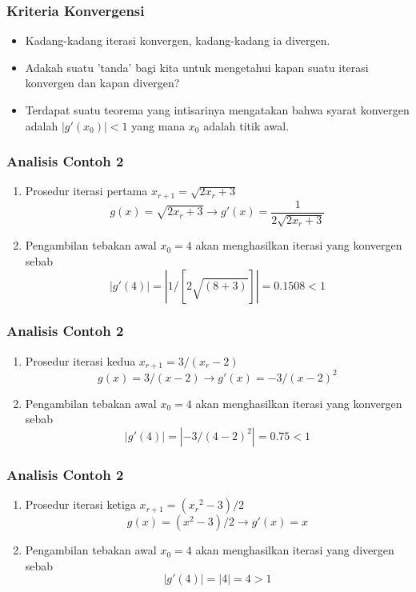 \documentclass[pdflatex,compress]{beamer}
\begin{document}
\begin{frame}
	\frametitle{Kriteria Konvergensi}
	\begin{itemize}
		\item Kadang-kadang iterasi konvergen, kadang-kadang ia divergen.
		\item Adakah suatu 'tanda' bagi kita untuk mengetahui kapan suatu iterasi konvergen dan kapan divergen?
		\item Terdapat suatu teorema yang intisarinya mengatakan bahwa syarat konvergen adalah $ |g'(x_0)| < 1 $ yang mana $ x_0 $ adalah titik awal.
	\end{itemize}
\end{frame}

\begin{frame}
	\frametitle{Analisis Contoh 2}
	\begin{enumerate}
		\item Prosedur iterasi pertama $ x_{r+1} = \sqrt{2x_r + 3} $
		\[ g(x) =  \sqrt{2x_r + 3} \rightarrow g'(x) =  \frac{1}{2\sqrt{2x_r + 3}} \]
		\item[] Pengambilan tebakan awal $ x_0 = 4 $ akan menghasilkan iterasi yang konvergen sebab
		\[ |g'(4)| = |1 / [2 \sqrt{(8+3)}]| = 0.1508 < 1\]
	\end{enumerate}
\end{frame}

\begin{frame}
	\frametitle{Analisis Contoh 2}
	\begin{enumerate}
		\item Prosedur iterasi kedua $ x_{r+1} = 3/(x_r - 2) $
		\[ g(x) =  3/(x - 2) \rightarrow g'(x) =  -3/(x - 2)^2 \]
		\item[] Pengambilan tebakan awal $ x_0 = 4 $ akan menghasilkan iterasi yang konvergen sebab
		\[ |g'(4)| = |-3/(4-2)^2| = 0.75 < 1\]
	\end{enumerate}
\end{frame}

\begin{frame}
	\frametitle{Analisis Contoh 2}
	\begin{enumerate}
		\item Prosedur iterasi ketiga $ x_{r+1} = ({x_r}^2 - 3)/2 $
		\[ g(x) = ({x}^2 - 3)/2 \rightarrow g'(x) =  x \]
		\item[] Pengambilan tebakan awal $ x_0 = 4 $ akan menghasilkan iterasi yang divergen sebab
		\[ |g'(4)| = |4| = 4 > 1\]
	\end{enumerate}
\end{frame}
\end{document}
